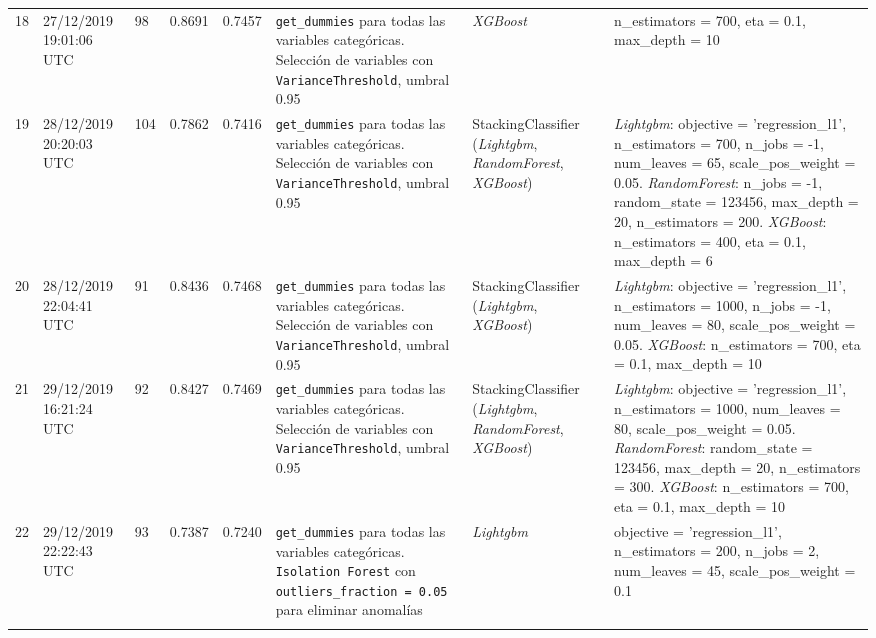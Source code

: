 \documentclass[a4paper, 20pt]{article}
\begin{document}
\begin{longtable}{lL{2.1cm}lllL{3cm}L{2.4cm}L{3.5cm}}
18 & 27/12/2019 19:01:06 UTC & 98 & 0.8691 & 0.7457 & \texttt{get\_dummies} para todas las variables categóricas. Selección de variables con \texttt{VarianceThreshold}, umbral 0.95 & \textit{XGBoost} & {\ttfamily n\_estimators = 700, eta = 0.1, max\_depth = 10}\\
\midrule

19 & 28/12/2019 20:20:03 UTC & 104 & 0.7862 & 0.7416 & \texttt{get\_dummies} para todas las variables categóricas. Selección de variables con \texttt{VarianceThreshold}, umbral 0.95 & StackingClassifier (\textit{Lightgbm}, \textit{RandomForest}, \textit{XGBoost}) & \textit{Lightgbm}: {\ttfamily objective = 'regression\_l1', n\_estimators = 700, n\_jobs = -1, num\_leaves = 65, scale\_pos\_weight = 0.05}. \textit{RandomForest}: {\ttfamily n\_jobs = -1, random\_state = 123456, max\_depth = 20, n\_estimators = 200}. \textit{XGBoost}: {\ttfamily n\_estimators = 400, eta = 0.1, max\_depth = 6}\\
\midrule

20 & 28/12/2019 22:04:41 UTC & 91 & 0.8436 & 0.7468 & \texttt{get\_dummies} para todas las variables categóricas. Selección de variables con \texttt{VarianceThreshold}, umbral 0.95 & StackingClassifier (\textit{Lightgbm}, \textit{XGBoost}) & \textit{Lightgbm}: {\ttfamily objective = 'regression\_l1', n\_estimators = 1000, n\_jobs = -1, num\_leaves = 80, scale\_pos\_weight = 0.05}. \textit{XGBoost}: {\ttfamily n\_estimators = 700, eta = 0.1, max\_depth = 10}\\
\midrule

21 & 29/12/2019 16:21:24 UTC & 92 & 0.8427 & 0.7469 & \texttt{get\_dummies} para todas las variables categóricas. Selección de variables con \texttt{VarianceThreshold}, umbral 0.95 & StackingClassifier (\textit{Lightgbm}, \textit{RandomForest}, \textit{XGBoost}) & \textit{Lightgbm}: {\ttfamily objective = 'regression\_l1', n\_estimators = 1000, num\_leaves = 80, scale\_pos\_weight = 0.05}. \textit{RandomForest}: {\ttfamily random\_state = 123456, max\_depth = 20, n\_estimators = 300}. \textit{XGBoost}: {\ttfamily n\_estimators = 700, eta = 0.1, max\_depth = 10}\\
\midrule

22 & 29/12/2019 22:22:43 UTC & 93 & 0.7387 & 0.7240 & \texttt{get\_dummies} para todas las variables categóricas. \texttt{Isolation Forest} con \texttt{outliers\_fraction = 0.05} para eliminar anomalías & \textit{Lightgbm} & {\ttfamily objective = 'regression\_l1', n\_estimators = 200, n\_jobs = 2, num\_leaves = 45, scale\_pos\_weight = 0.1}\\
\midrule


\end{longtable}
\end{document}
